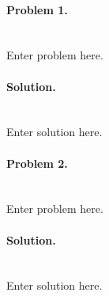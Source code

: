 \documentclass[12pt]{article}
\begin{document}
\MakeTitleDateTop

\paragraph{Problem 1.} \mbox{} \\
Enter problem here.

\paragraph{Solution.} \mbox{} \\
Enter solution here.

\paragraph{Problem 2.} \mbox{} \\
Enter problem here. 

\paragraph{Solution.} \mbox{} \\
Enter solution here.

\newpage

% 
\end{document}
